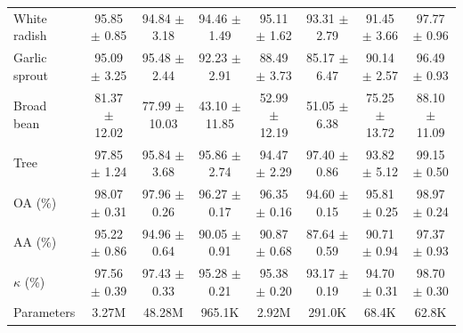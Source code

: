 \begin{table}[htbp]
{\begin{tabular}{l c c c c c c c}
    White radish & \textcolor{tgblue}{95.85 $\pm$ 0.85} & 94.84 $\pm$ 3.18 & 94.46 $\pm$ 1.49 & \textcolor{tgred}{95.11 $\pm$ 1.62} & 93.31 $\pm$ 2.79 & 91.45 $\pm$ 3.66 & \textcolor{tgteal}{97.77 $\pm$ 0.96} \\
    Garlic sprout & \textcolor{tgred}{95.09 $\pm$ 3.25} & \textcolor{tgblue}{95.48 $\pm$ 2.44} & 92.23 $\pm$ 2.91 & 88.49 $\pm$ 3.73 & 85.17 $\pm$ 6.47 & 90.14 $\pm$ 2.57 & \textcolor{tgteal}{96.49 $\pm$ 0.93} \\
    Broad bean & \textcolor{tgblue}{81.37 $\pm$ 12.02} & \textcolor{tgred}{77.99 $\pm$ 10.03} & 43.10 $\pm$ 11.85 & 52.99 $\pm$ 12.19 & 51.05 $\pm$ 6.38 & 75.25 $\pm$ 13.72 & \textcolor{tgteal}{88.10 $\pm$ 11.09} \\
    Tree & \textcolor{tgblue}{97.85 $\pm$ 1.24} & 95.84 $\pm$ 3.68 & 95.86 $\pm$ 2.74 & 94.47 $\pm$ 2.29 & \textcolor{tgred}{97.40 $\pm$ 0.86} & 93.82 $\pm$ 5.12 & \textcolor{tgteal}{99.15 $\pm$ 0.50} \\
    \midrule
    OA (\%) & \textcolor{tgblue}{98.07 $\pm$ 0.31} & \textcolor{tgred}{97.96 $\pm$ 0.26} & 96.27 $\pm$ 0.17 & 96.35 $\pm$ 0.16 & 94.60 $\pm$ 0.15 & 95.81 $\pm$ 0.25 & \textcolor{tgteal}{98.97 $\pm$ 0.24} \\
    AA (\%) & \textcolor{tgblue}{95.22 $\pm$ 0.86} & \textcolor{tgred}{94.96 $\pm$ 0.64} & 90.05 $\pm$ 0.91 & 90.87 $\pm$ 0.68 & 87.64 $\pm$ 0.59 & 90.71 $\pm$ 0.94 & \textcolor{tgteal}{97.37 $\pm$ 0.93} \\
    $\kappa$ (\%) & \textcolor{tgblue}{97.56 $\pm$ 0.39} & \textcolor{tgred}{97.43 $\pm$ 0.33} & 95.28 $\pm$ 0.21 & 95.38 $\pm$ 0.20 & 93.17 $\pm$ 0.19 & 94.70 $\pm$ 0.31 & \textcolor{tgteal}{98.70 $\pm$ 0.30} \\
    \midrule
    Parameters & 3.27M & 48.28M & 965.1K & 2.92M & 291.0K & 68.4K & 62.8K \\
    \bottomrule
  \end{tabular}%
  }
\end{table}

